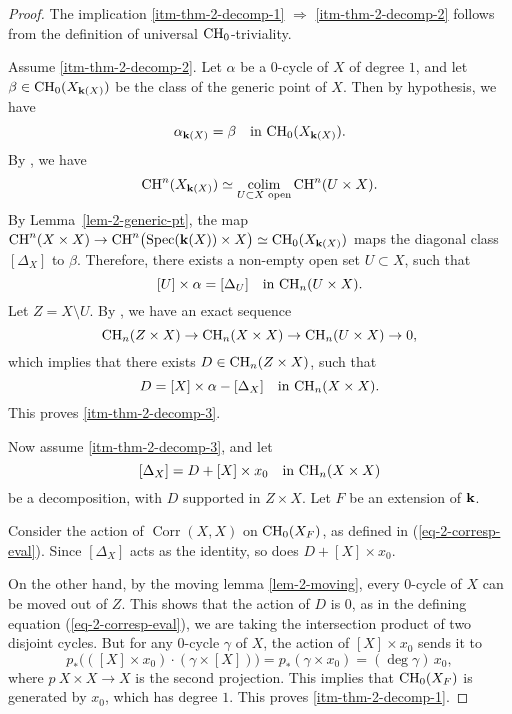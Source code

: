 \begin{proof}
    The implication \ref{itm-thm-2-decomp-1} $\Rightarrow$ \ref{itm-thm-2-decomp-2}
    follows from the definition of universal $\mathrm{CH}_0$-triviality.

    Assume \ref{itm-thm-2-decomp-2}.
    Let $\alpha$ be a $0$-cycle of $X$ of degree $1$,
    and let $\beta \in \CH_0 (X_{\bbk (X)})$ be the class of the generic point of $X$. 
    Then by hypothesis, we have
    \[ \alpha_{\bbk (X)} = \beta \quad \text{in } \CH_0 (X_{\bbk (X)}). \]
    By \cite[Lemma~1A.1]{bloch}, we have
    \[ \CH^n ( X_{\bbk (X)} ) \simeq \colim _{U \subset X \text{ open}} \CH^n (U \times X). \]
    By Lemma~\ref{lem-2-generic-pt}, the map 
    $\CH^n (X \times X) \to \CH^n \bigl( \Spec (\bbk(X)) \times X \bigr) \simeq \CH_0 (X_{\bbk (X)})$
    maps the diagonal class $[\Delta_X]$ to $\beta$. Therefore,
    there exists a non-empty open set $U \subset X$, such that
    \[ [U] \times \alpha = [\Delta_U] \quad \text{in } \mathrm{CH}_n (U \times X). \]
    Let $Z = X \setminus U$. By \cite[\S1.8]{fulton}, we have an exact sequence
    \[ \mathrm{CH}_n (Z \times X) \to \mathrm{CH}_n (X \times X) \to \mathrm{CH}_n (U \times X) \to 0, \]
    which implies that there exists $D \in \mathrm{CH}_n (Z \times X)$, such that
    \[ D = [X] \times \alpha - [\Delta_X] \quad \text{in } \mathrm{CH}_n (X \times X). \]
    This proves \ref{itm-thm-2-decomp-3}.

    Now assume \ref{itm-thm-2-decomp-3}, and let
    \[ [\Delta_X] = D + [X] \times x_0 \quad \text{in } \mathrm{CH}_n (X \times X) \]
    be a decomposition, with $D$ supported in $Z \times X$.
    Let $F$ be an extension of $\bbk$.

    Consider the action of $\operatorname{Corr} (X, X)$ 
    on $\mathrm{CH}_0 (X_F)$, as defined in (\ref{eq-2-corresp-eval}).
    Since $[\Delta_X]$ acts as the identity, so does $D + [X] \times x_0$.

    On the other hand, by the moving lemma \ref{lem-2-moving},
    every $0$-cycle of $X$ can be moved out of $Z$. 
    This shows that the action of $D$ is $0$,
    as in the defining equation (\ref{eq-2-corresp-eval}), we are taking the intersection product of two disjoint cycles.
    But for any $0$-cycle $\gamma$ of $X$, the action of $[X] \times x_0$ sends it to
    \[ 
        p_* \bigl( ([X] \times x_0) \cdot (\gamma \times [X]) \bigr) = p_* (\gamma \times x_0) = (\deg \gamma) \, x_0,
    \]
    where $p \: X \times X \to X$ is the second projection. This
    implies that $\mathrm{CH}_0 (X_F)$ is generated by $x_0$, which has degree $1$.
    This proves \ref{itm-thm-2-decomp-1}.
\end{proof}

